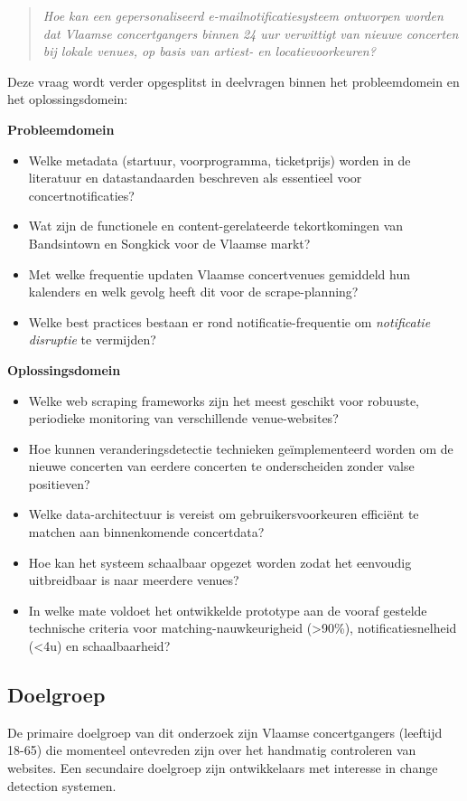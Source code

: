 \begin{quote}
\textit{Hoe kan een gepersonaliseerd e-mailnotificatiesysteem ontworpen worden dat Vlaamse concertgangers binnen 24 uur verwittigt van nieuwe concerten bij lokale venues, op basis van artiest- en locatievoorkeuren?}
\end{quote}

Deze vraag wordt verder opgesplitst in deelvragen binnen het probleemdomein en het oplossingsdomein:

\textbf{Probleemdomein}
\begin{itemize}
    \item Welke metadata (startuur, voorprogramma, ticketprijs) worden in de literatuur en datastandaarden beschreven als essentieel voor concertnotificaties?
    \item Wat zijn de functionele en content-gerelateerde tekortkomingen van Bandsintown en Songkick voor de Vlaamse markt?
    \item Met welke frequentie updaten Vlaamse concertvenues gemiddeld hun kalenders en welk gevolg heeft dit voor de scrape-planning?
    \item Welke best practices bestaan er rond notificatie-frequentie om \textit{notificatie disruptie} te vermijden?
\end{itemize}

\textbf{Oplossingsdomein}
\begin{itemize}
    \item Welke web scraping frameworks zijn het meest geschikt voor robuuste, periodieke monitoring van verschillende venue-websites?
    \item Hoe kunnen veranderingsdetectie technieken geïmplementeerd worden om de nieuwe concerten van eerdere concerten te onderscheiden zonder valse positieven?
    \item Welke data-architectuur is vereist om gebruikersvoorkeuren efficiënt te matchen aan binnenkomende concertdata?
    \item Hoe kan het systeem schaalbaar opgezet worden zodat het eenvoudig uitbreidbaar is naar meerdere venues?
    \item In welke mate voldoet het ontwikkelde prototype aan de vooraf gestelde technische criteria voor matching-nauwkeurigheid (>90\%), notificatiesnelheid (<4u) en schaalbaarheid?
\end{itemize}

\subsection{Doelgroep}
De primaire doelgroep van dit onderzoek zijn Vlaamse concertgangers (leeftijd 18-65) die momenteel ontevreden zijn over het handmatig controleren van websites. Een secundaire doelgroep zijn ontwikkelaars met interesse in change detection systemen.

